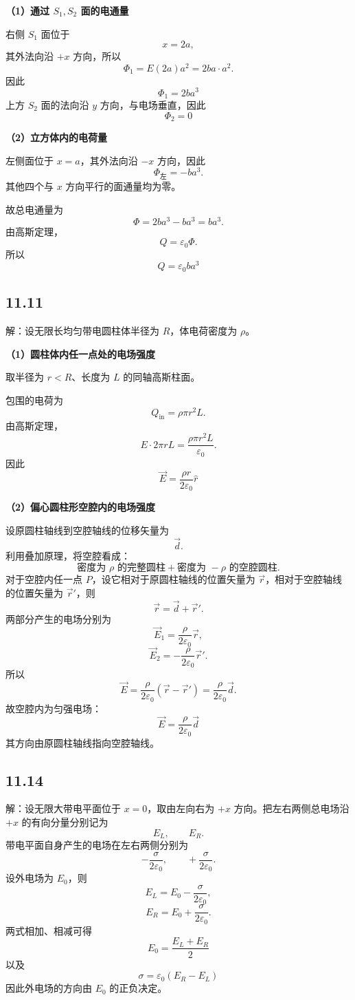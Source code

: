 \documentclass[UTF8,a4paper,12pt]{ctexart}
\begin{document}
\textbf{（1）通过 $S_1,S_2$ 面的电通量}

右侧 $S_1$ 面位于
\[
x=2a,
\]
其外法向沿 $+x$ 方向，所以
\[
\Phi_1
=
E(2a)a^2
=
2ba\cdot a^2.
\]
因此
\[
\boxed{
\Phi_1=2ba^3
}
\]
上方 $S_2$ 面的法向沿 $y$ 方向，与电场垂直，因此
\[
\boxed{
\Phi_2=0
}
\]

\textbf{（2）立方体内的电荷量}

左侧面位于 $x=a$，其外法向沿 $-x$ 方向，因此
\[
\Phi_{\text{左}}
=
-ba^3.
\]
其他四个与 $x$ 方向平行的面通量均为零。

故总电通量为
\[
\Phi
=
2ba^3-ba^3
=
ba^3.
\]
由高斯定理，
\[
Q=\varepsilon_0\Phi.
\]
所以
\[
\boxed{
Q=\varepsilon_0ba^3
}
\]

\subsection*{11.11}

解：设无限长均匀带电圆柱体半径为 $R$，体电荷密度为 $\rho$。

\textbf{（1）圆柱体内任一点处的电场强度}

取半径为 $r<R$、长度为 $L$ 的同轴高斯柱面。

包围的电荷为
\[
Q_{\text{in}}
=
\rho\pi r^2L.
\]
由高斯定理，
\[
E\cdot2\pi rL
=
\frac{\rho\pi r^2L}{\varepsilon_0}.
\]
因此
\[
\boxed{
\vec{E}
=
\frac{\rho r}{2\varepsilon_0}\hat{r}
}
\]

\textbf{（2）偏心圆柱形空腔内的电场强度}

设原圆柱轴线到空腔轴线的位移矢量为
\[
\vec{d}.
\]
利用叠加原理，将空腔看成：
\[
\text{密度为 }\rho\text{ 的完整圆柱}
+
\text{密度为 }-\rho\text{ 的空腔圆柱}.
\]
对于空腔内任一点 $P$，设它相对于原圆柱轴线的位置矢量为 $\vec{r}$，相对于空腔轴线的位置矢量为 $\vec{r}'$，则
\[
\vec{r}=\vec{d}+\vec{r}'.
\]
两部分产生的电场分别为
\[
\vec{E}_1
=
\frac{\rho}{2\varepsilon_0}\vec{r},
\]
\[
\vec{E}_2
=
-\frac{\rho}{2\varepsilon_0}\vec{r}'.
\]
所以
\[
\vec{E}
=
\frac{\rho}{2\varepsilon_0}
(\vec{r}-\vec{r}')
=
\frac{\rho}{2\varepsilon_0}\vec{d}.
\]
故空腔内为匀强电场：
\[
\boxed{
\vec{E}
=
\frac{\rho}{2\varepsilon_0}\vec{d}
}
\]
其方向由原圆柱轴线指向空腔轴线。

\subsection*{11.14}

解：设无限大带电平面位于 $x=0$，取由左向右为 $+x$ 方向。把左右两侧总电场沿 $+x$ 的有向分量分别记为
\[
E_L,\qquad E_R.
\]
带电平面自身产生的电场在左右两侧分别为
\[
-\frac{\sigma}{2\varepsilon_0},
\qquad
+\frac{\sigma}{2\varepsilon_0}.
\]
设外电场为 $E_0$，则
\[
E_L
=
E_0-\frac{\sigma}{2\varepsilon_0},
\]
\[
E_R
=
E_0+\frac{\sigma}{2\varepsilon_0}.
\]
两式相加、相减可得
\[
\boxed{
E_0=\frac{E_L+E_R}{2}
}
\]
以及
\[
\boxed{
\sigma
=
\varepsilon_0(E_R-E_L)
}
\]
因此外电场的方向由 $E_0$ 的正负决定。
\end{document}
